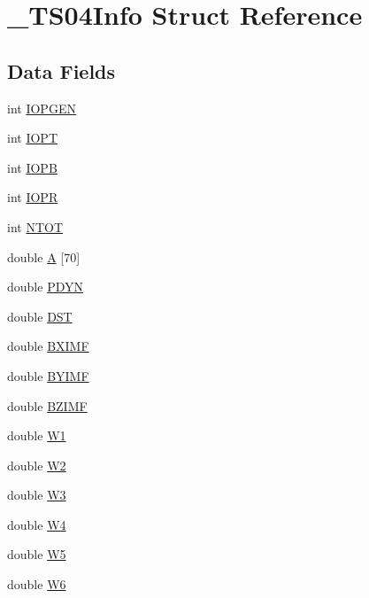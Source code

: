 \hypertarget{struct___t_s04_info}{
\section{\_\-TS04Info Struct Reference}
\label{struct___t_s04_info}
}
\subsection*{Data Fields}
\begin{CompactItemize}
\item 
int \hyperlink{struct___t_s04_info_cd246ede1b8a4a4fd4696653df7ba165}{IOPGEN}
\item 
int \hyperlink{struct___t_s04_info_9a0935747b885ca88e6e635b0ba85be7}{IOPT}
\item 
int \hyperlink{struct___t_s04_info_d288271af02815f7cab79e1d9d16827c}{IOPB}
\item 
int \hyperlink{struct___t_s04_info_6707cabde8b700cd0ded61d69a272960}{IOPR}
\item 
int \hyperlink{struct___t_s04_info_459caca3342bee05a2b76c6df3e085f3}{NTOT}
\item 
double \hyperlink{struct___t_s04_info_8e2788d33afba470d0eaf0adef38d288}{A} \mbox{[}70\mbox{]}
\item 
double \hyperlink{struct___t_s04_info_6b4050a424d9e166a322d335d97ffa85}{PDYN}
\item 
double \hyperlink{struct___t_s04_info_4e71f147ed71b137b574a818a29c5f43}{DST}
\item 
double \hyperlink{struct___t_s04_info_e79afdc213835f23f6c3d9c61149e4e2}{BXIMF}
\item 
double \hyperlink{struct___t_s04_info_821525967f196af580b5f98ff816aae8}{BYIMF}
\item 
double \hyperlink{struct___t_s04_info_f36b8e6d8f3578a7f8274ec30917f4a2}{BZIMF}
\item 
double \hyperlink{struct___t_s04_info_34cbf6576a130ac93a6a2eeb153263b3}{W1}
\item 
double \hyperlink{struct___t_s04_info_63a3207d198302df77e4bb177339f18f}{W2}
\item 
double \hyperlink{struct___t_s04_info_0a5ed99cbecc8835fafcb0bcb8345e5b}{W3}
\item 
double \hyperlink{struct___t_s04_info_6e860cf299bef0c1ccc448ee80760947}{W4}
\item 
double \hyperlink{struct___t_s04_info_73d56f377ea7552b6b64161fe51237f8}{W5}
\item 
double \hyperlink{struct___t_s04_info_866e9e4ccaa55cf04d187988806f1250}{W6}

\end{CompactItemize}
